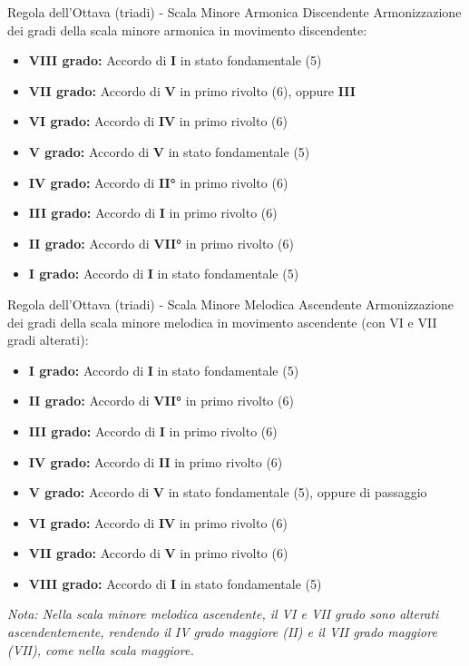 \begin{regola}{Regola dell'Ottava (triadi) - Scala Minore Armonica Discendente}
	\label{reg:regola_ottava_minore_disc}
	Armonizzazione dei gradi della scala minore armonica in movimento discendente:
	
	\begin{itemize}
		\item \textbf{VIII grado:} Accordo di \textbf{I} in stato fondamentale (5)
		\item \textbf{VII grado:} Accordo di \textbf{V} in primo rivolto (6), oppure \textbf{III}
		\item \textbf{VI grado:} Accordo di \textbf{IV} in primo rivolto (6)
		\item \textbf{V grado:} Accordo di \textbf{V} in stato fondamentale (5)
		\item \textbf{IV grado:} Accordo di \textbf{II°} in primo rivolto (6)
		\item \textbf{III grado:} Accordo di \textbf{I} in primo rivolto (6)
		\item \textbf{II grado:} Accordo di \textbf{VII°} in primo rivolto (6)
		\item \textbf{I grado:} Accordo di \textbf{I} in stato fondamentale (5)
	\end{itemize}
\end{regola}



\begin{regola}{Regola dell'Ottava (triadi) - Scala Minore Melodica Ascendente}
	\label{reg:regola_ottava_melodica_asc}
	Armonizzazione dei gradi della scala minore melodica in movimento ascendente (con VI e VII gradi alterati):
	
	\begin{itemize}
		\item \textbf{I grado:} Accordo di \textbf{I} in stato fondamentale (5)
		\item \textbf{II grado:} Accordo di \textbf{VII°} in primo rivolto (6)
		\item \textbf{III grado:} Accordo di \textbf{I} in primo rivolto (6)
		\item \textbf{IV grado:} Accordo di \textbf{II} in primo rivolto (6)
		\item \textbf{V grado:} Accordo di \textbf{V} in stato fondamentale (5), oppure  di passaggio
		\item \textbf{VI grado:} Accordo di \textbf{IV} in primo rivolto (6)
		\item \textbf{VII grado:} Accordo di \textbf{V} in primo rivolto (6)
		\item \textbf{VIII grado:} Accordo di \textbf{I} in stato fondamentale (5)
	\end{itemize}
	
	\textit{Nota: Nella scala minore melodica ascendente, il VI e VII grado sono alterati ascendentemente, rendendo il IV grado maggiore (II) e il VII grado maggiore (VII), come nella scala maggiore.}
\end{regola}


